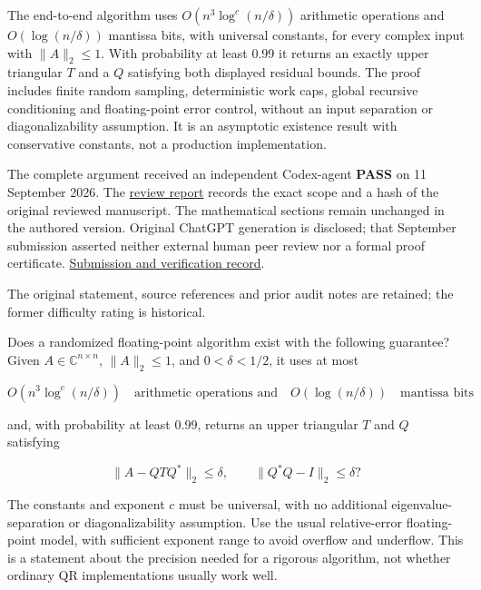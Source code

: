\documentclass[11pt,a4paper]{article}
\makeatletter
\renewcommand{\subsection}{\Needspace{4\baselineskip}\@startsection{subsection}{2}{0pt}{9pt plus 1pt minus 1pt}{3pt}{\sffamily\bfseries\normalsize\color{ink}}}
\makeatother
\begin{document}
The end-to-end algorithm uses \(O(n^3\log^c(n/\delta))\) arithmetic
operations and \(O(\log(n/\delta))\) mantissa bits, with universal
constants, for every complex input with \(\|A\|_2\le1\). With
probability at least \(0.99\) it returns an exactly upper triangular
\(T\) and a \(Q\) satisfying both displayed residual bounds. The proof
includes finite random sampling, deterministic work caps, global
recursive conditioning and floating-point error control, without an
input separation or diagonalizability assumption. It is an asymptotic
existence result with conservative constants, not a production
implementation.

The complete argument received an independent Codex-agent \textbf{PASS}
on 11 September 2026. The
\href{https://github.com/ajt60gaibb/OpenProblemsInNLA/blob/main/references/colbrook-additional-2026-09-11/verification/reviews/IE-08-review.md}{review
report} records the exact scope and a hash of the original reviewed
manuscript. The mathematical sections remain unchanged in the authored
version. Original ChatGPT generation is disclosed; that September
submission asserted neither external human peer review nor a formal
proof certificate.
\href{https://github.com/ajt60gaibb/OpenProblemsInNLA/blob/main/references/colbrook-additional-2026-09-11/README.md}{Submission
and verification record}.

The original statement, source references and prior audit notes are
retained; the former difficulty rating is historical.

\subsection{Problem statement}\label{problem-statement}

Does a randomized floating-point algorithm exist with the following
guarantee? Given \(A\in\mathbb C^{n\times n}\), \(\|A\|_2\leq1\), and
\(0<\delta<1/2\), it uses at most

\[O(n^3\log^c(n/\delta))\quad\text{arithmetic operations and}\quad
O(\log(n/\delta))\quad\text{mantissa bits}\]

and, with probability at least \(0.99\), returns an upper triangular
\(T\) and \(Q\) satisfying

\[\|A-QTQ^*\|_2\leq\delta,
\qquad \|Q^*Q-I\|_2\leq\delta?\]

The constants and exponent \(c\) must be universal, with no additional
eigenvalue-separation or diagonalizability assumption. Use the usual
relative-error floating-point model, with sufficient exponent range to
avoid overflow and underflow. This is a statement about the precision
needed for a rigorous algorithm, not whether ordinary QR implementations
usually work well.
\end{document}
